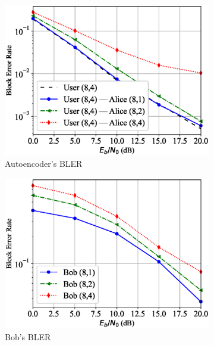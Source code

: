 \begin{figure}[tp!]
	\begin{subfigure}{0.28\textwidth}
		\includegraphics[width=\linewidth]{figs/covert_autoencoder_bler_rician}
		\caption{Autoencoder's BLER}
		\label{fig:rician_resutls_ae}
	\end{subfigure}
	\hspace*{\fill}
	\begin{subfigure}{0.28\textwidth}
		\includegraphics[width=\linewidth]{figs/bob_bler_rician}
		\caption{Bob's BLER}
		\label{fig:rician_resutls_bob}	
	\end{subfigure}
	\hspace*{\fill}
	\begin{subfigure}{0.28\textwidth}

\end{subfigure}
\end{figure}
